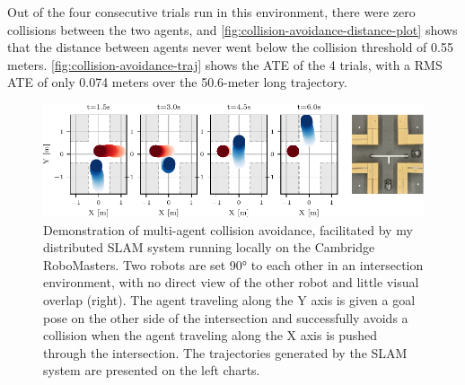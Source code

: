 Out of the four consecutive trials run in this environment, there were zero collisions between the two agents, and \autoref{fig:collision-avoidance-distance-plot} shows that the distance between agents never went below the collision threshold of 0.55 meters. \autoref{fig:collision-avoidance-traj} shows the ATE of the 4 trials, with a RMS ATE of only 0.074 meters over the 50.6-meter long trajectory.


\begin{figure}[h]
    \centering
    \includegraphics[width=\linewidth]{figures/mar25_1_tracer_graph.pdf}

    \caption{Demonstration of multi-agent collision avoidance, facilitated by my distributed SLAM system running locally on the Cambridge RoboMasters. Two robots are set 90° to each other in an intersection environment, with no direct view of the other robot and little visual overlap (right). The agent traveling along the Y axis is given a goal pose on the other side of the intersection and successfully avoids a collision when the agent traveling along the X axis is pushed through the intersection. The trajectories generated by the SLAM system are presented on the left charts.}
    \label{fig:collision-avoidance}
\end{figure}

